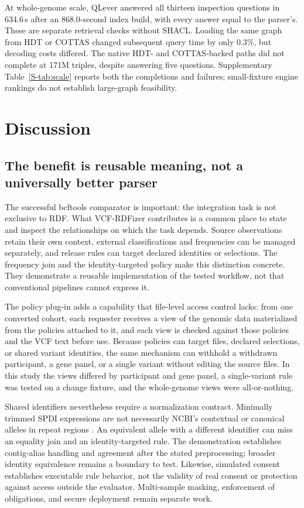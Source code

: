 \documentclass[pdflatex,sn-mathphys-num]{sn-jnl}
\begin{document}
At whole-genome scale, QLever answered all thirteen inspection questions in 634.6\,s after an 868.0-second index build, with every answer equal to the parser's. 
These are separate retrieval checks without SHACL. 
Loading the same graph from HDT or COTTAS changed subsequent query time by only 0.3\%, but decoding costs differed. 
The native HDT- and COTTAS-backed paths did not complete at 171M triples, despite answering five questions. 
Supplementary Table~\ref{S-tab:scale} reports both the completions and failures; small-fixture engine rankings do not establish large-graph feasibility.

\section{Discussion}\label{sec4}
\subsection{The benefit is reusable meaning, not a universally better parser}\label{subsec:when}
The successful bcftools comparator is important: the integration task is not exclusive to RDF. 
What VCF-RDFizer contributes is a common place to state and inspect the relationships on which the task depends. 
Source observations retain their own context, external classifications and frequencies can be managed separately, and release rules can target declared identities or selections. 
The frequency join and the identity-targeted policy make this distinction concrete. 
They demonstrate a reusable implementation of the tested workflow, not that conventional pipelines cannot express it.

The policy plug-in adds a capability that file-level access control lacks: from one converted cohort, each requester receives a view of the genomic data materialized from the policies attached to it, and each view is checked against those policies and the VCF text before use. 
Because policies can target files, declared selections, or shared variant identities, the same mechanism can withhold a withdrawn participant, a gene panel, or a single variant without editing the source files. 
In this study the views differed by participant and gene panel, a single-variant rule was tested on a change fixture, and the whole-genome views were all-or-nothing.

Shared identifiers nevertheless require a normalization contract. 
Minimally trimmed SPDI expressions are not necessarily NCBI's contextual or canonical alleles in repeat regions \cite{holmes2020spdi}. 
An equivalent allele with a different identifier can miss an equality join and an identity-targeted rule. 
The demonstration establishes contig-alias handling and agreement after the stated preprocessing; broader identity equivalence remains a boundary to test. 
Likewise, simulated consent establishes executable rule behavior, not the validity of real consent or protection against access outside the evaluator. 
Multi-sample masking, enforcement of obligations, and secure deployment remain separate work.
\end{document}

